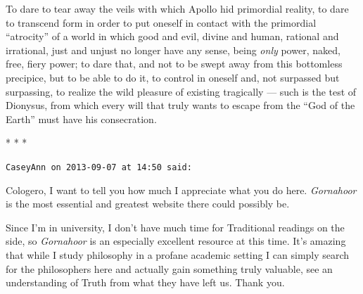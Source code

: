 \begin{quotex}
To dare to tear away the veils with which Apollo hid primordial reality, to dare to transcend form in order to put oneself in contact with the primordial ``atrocity'' of a world in which good and evil, divine and human, rational and irrational, just and unjust no longer have any sense, being \emph{only} power, naked, free, fiery power; to dare that, and not to be swept away from this bottomless precipice, but to be able to do it, to control in oneself and, not surpassed but surpassing, to realize the wild pleasure of existing tragically --- such is the test of Dionysus, from which every will that truly wants to escape from the ``God of the Earth'' must have his consecration.
\end{quotex}




\begin{center}* * *\end{center}

\begin{footnotesize}
\begin{sffamily}

\texttt{CaseyAnn on 2013-09-07 at 14:50 said:}

Cologero, I want to tell you how much I appreciate what you do here. \emph{Gornahoor} is the most essential and greatest website there could possibly be.

Since I'm in university, I don't have much time for Traditional readings on the side, so \emph{Gornahoor} is an especially excellent resource at this time. It's amazing that while I study philosophy in a profane academic setting I can simply search for the philosophers here and actually gain something truly valuable, see an understanding of Truth from what they have left us. Thank you.


\hfill

\end{sffamily}
\end{footnotesize}

